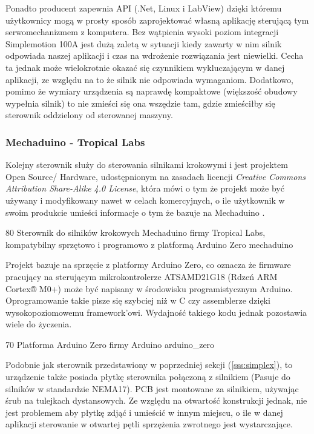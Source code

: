 Ponadto producent zapewnia API (.Net, Linux i LabView) dzięki któremu użytkownicy mogą w prosty sposób zaprojektować własną aplikację sterującą tym serwomechanizmem z komputera. Bez wątpienia wysoki poziom integracji Simplemotion 100A jest dużą zaletą w sytuacji kiedy zawarty w nim silnik odpowiada naszej aplikacji i czas na wdrożenie rozwiązania jest niewielki. Cecha ta jednak może wielokrotnie okazać się czynnikiem wykluczającym w danej aplikacji, ze względu na to że silnik nie odpowiada wymaganiom. Dodatkowo, pomimo że wymiary urządzenia są naprawdę kompaktowe (większość obudowy wypełnia silnik) to nie zmieści się ona wszędzie tam, gdzie zmieściłby się sterownik oddzielony od sterowanej maszyny.

\subsubsection{Mechaduino - Tropical Labs}

Kolejny sterownik służy do sterowania silnikami krokowymi i jest projektem Open Source/ Hardware, udostępnionym na zasadach licencji {\it Creative Commons Attribution Share-Alike 4.0 License}, która mówi o tym że projekt może być używany i modyfikowany nawet w celach komercyjnych, o ile użytkownik w swoim produkcie umieści informacje o tym że bazuje na Mechaduino \cite{crcommons}.  

	{80}
	{Sterownik do silników krokowych Mechaduino firmy Tropical Labs, kompatybilny sprzętowo i programowo z platformą Arduino Zero}
	{mechaduino}
	
Projekt bazuje na sprzęcie z platformy Arduino Zero, co oznacza że firmware pracujący na sterującym mikrokontrolerze ATSAMD21G18 (Rdzeń ARM Cortex® M0+) może być napisany w środowisku programistycznym Arduino. Oprogramowanie takie pisze się szybciej niż w C czy assemblerze dzięki wysokopoziomowemu framework'owi. Wydajność takiego kodu jednak pozostawia wiele do życzenia.

	{70}
	{Platforma Arduino Zero firmy Arduino}
	{arduino_zero}
	
Podobnie jak sterownik przedstawiony w poprzedniej sekcji (\ref{sss:simplex}), to urządzenie także posiada płytkę sterownika połączoną z silnikiem (Pasuje do silników w standardzie NEMA17). PCB jest montowane za silnikiem, używając śrub na tulejkach dystansowych. Ze względu na otwartość konstrukcji jednak, nie jest problemem aby płytkę zdjąć i umieścić w innym miejscu, o ile w danej aplikacji sterowanie w otwartej pętli sprzężenia zwrotnego jest wystarczające. 

